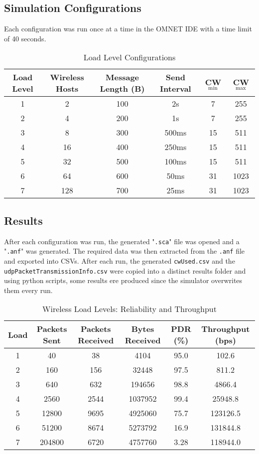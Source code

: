 \documentclass{rapport}
\begin{document}
\subsection{Simulation Configurations}
Each configuration was run once at a time in the OMNET IDE with a time limit of 40 seconds. 
\begin{table}[H]
\centering
\caption{Load Level Configurations}
\begin{tabular}{|c|c|c|c|c|c|}
\hline
Load Level & Wireless Hosts & Message Length (B) & Send Interval & CW$_{\text{min}}$ & CW$_{\text{max}}$ \\
\hline
1 & 2   & 100 & 2s    & 7  & 255  \\
2 & 4   & 200 & 1s    & 7  & 255  \\
3 & 8   & 300 & 500ms & 15 & 511  \\
4 & 16  & 400 & 250ms & 15 & 511  \\
5 & 32  & 500 & 100ms & 15 & 511  \\
6 & 64  & 600 & 50ms  & 31 & 1023 \\
7 & 128 & 700 & 25ms  & 31 & 1023 \\
\hline
\end{tabular}
\end{table}

\subsection{Results}
After each configuration was run, the generated "\texttt{.sca}" file was opened and a "\texttt{.anf}" was generated. The required data was then extracted from the \texttt{.anf} file and exported into CSVs. After each run, the generated \texttt{cwUsed.csv} and the \texttt{udpPacketTransmissionInfo.csv} were copied into a distinct results folder and using python scripts, some results ere produced since the simulator overwrites them every run.

\begin{table}[H]
\centering
\caption{Wireless Load Levels: Reliability and Throughput}
\begin{tabular}{|c|c|c|c|c|c|}
\hline
Load & Packets Sent & Packets Received & Bytes Received & PDR (\%) & Throughput (bps) \\
\hline
1 & 40     & 38     & 4104     & 95.0  & 102.6     \\
2 & 160    & 156    & 32448    & 97.5  & 811.2    \\
3 & 640    & 632    & 194656   & 98.8  & 4866.4   \\
4 & 2560   & 2544   & 1037952  & 99.4  & 25948.8  \\
5 & 12800  & 9695   & 4925060  & 75.7  & 123126.5 \\
6 & 51200  & 8674   & 5273792  & 16.9  & 131844.8 \\
7 & 204800 & 6720   & 4757760  & 3.28  & 118944.0 \\
\hline
\end{tabular}
\end{table}
\end{document}

